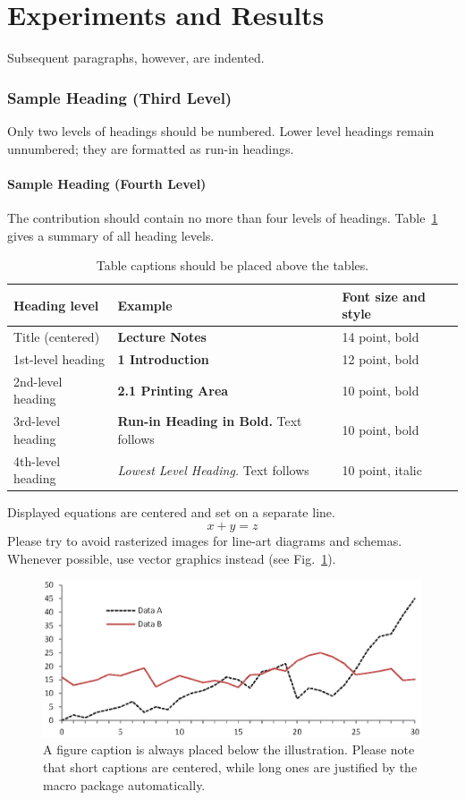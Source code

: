 \documentclass[runningheads]{llncs}
\begin{document}
\section{Experiments and Results}
Subsequent paragraphs, however, are indented.

\subsubsection{Sample Heading (Third Level)} Only two levels of
headings should be numbered. Lower level headings remain unnumbered;
they are formatted as run-in headings.

\paragraph{Sample Heading (Fourth Level)}
The contribution should contain no more than four levels of
headings. Table~\ref{tab1} gives a summary of all heading levels.

\begin{table}
\caption{Table captions should be placed above the
tables.}\label{tab1}
\begin{tabular}{|l|l|l|}
\hline
Heading level &  Example & Font size and style\\
\hline
Title (centered) &  {\Large\bfseries Lecture Notes} & 14 point, bold\\
1st-level heading &  {\large\bfseries 1 Introduction} & 12 point, bold\\
2nd-level heading & {\bfseries 2.1 Printing Area} & 10 point, bold\\
3rd-level heading & {\bfseries Run-in Heading in Bold.} Text follows & 10 point, bold\\
4th-level heading & {\itshape Lowest Level Heading.} Text follows & 10 point, italic\\
\hline
\end{tabular}
\end{table}


\noindent Displayed equations are centered and set on a separate
line.
\begin{equation}
x + y = z
\end{equation}
Please try to avoid rasterized images for line-art diagrams and
schemas. Whenever possible, use vector graphics instead (see
Fig.~\ref{fig1}).

\begin{figure}
\includegraphics[width=\textwidth]{fig1.eps}
\caption{A figure caption is always placed below the illustration.
Please note that short captions are centered, while long ones are
justified by the macro package automatically.} \label{fig1}
\end{figure}
\end{document}
